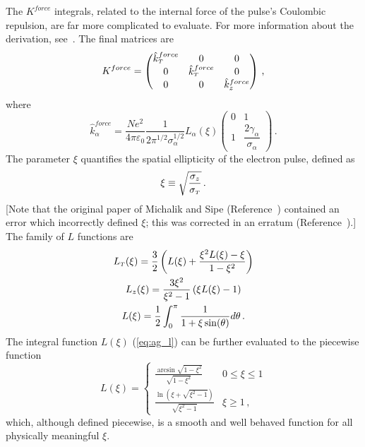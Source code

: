The $K^{force}$ integrals, related to the internal force of the pulse's Coulombic repulsion, are far more complicated to evaluate.
For more information about the derivation, see~\cite{michalik_analytic_2006}. %
The final matrices are
\begin{equation}
  K^{force} = 
  \begin{pmatrix}
    \hat{k}^{force}_{{\scriptscriptstyle T}} & 0 & 0 \\
    0 & \hat{k}^{force}_{{\scriptscriptstyle T}} & 0 \\
    0 & 0 & \hat{k}^{force}_{z}
  \end{pmatrix} \,\text{,}
\end{equation}
where
\begin{equation}
  \hat{k}^{force}_{\alpha} = 
  \frac{N e^2}{4\pi\varepsilon_0} \frac{1}{2\pi^{1/2}\sigma_{\alpha}^{1/2}} L_{\alpha}(\xi)
  \begin{pmatrix}
    0 & 1 \\
    1 & \dfrac{2 \gamma_{\alpha}}{\sigma_{\alpha}}
  \end{pmatrix} \,\text{.}
\end{equation}
The parameter $\xi$ quantifies the spatial ellipticity of the electron pulse, defined as
\begin{equation} \label{eq:define_xi}
  \xi \equiv \sqrt{\dfrac{\sigma_{z}}{\sigma_{{\scriptscriptstyle T}}}} \,\text{.}
\end{equation}
[Note that the original paper of Michalik and Sipe (Reference~\cite{michalik_analytic_2006}) contained an error which incorrectly defined $\xi$; this was corrected in an erratum (Reference~\cite{michalik_erratum:_2008}).]
The family of $L$ functions are
\begin{subequations} \label{eq:ag_l_family}
  \begin{gather}
    L_{{\scriptscriptstyle T}}(\xi) = \frac{3}{2} \left( L(\xi) + \frac{\xi^2 L(\xi) - \xi}{ 1 - \xi^2 } \right) \\
    L_{z}(\xi) = \frac{ 3 \xi^2 }{ \xi^2 - 1} \left( \xi L(\xi) - 1 \right) \\
    L(\xi) = \frac{1}{2} \int_0^{\pi} \frac{1}{1+\xi\sin(\theta)} d\theta \,\text{.} \label{eq:ag_l}
  \end{gather}
\end{subequations}
The integral function $L(\xi)$ (\ref{eq:ag_l}) can be further evaluated to the piecewise function
\begin{equation}
  L(\xi) = 
  \begin{cases}
    \frac{ \arcsin \sqrt{1-\xi^2} }{ \sqrt{1-\xi^2} } & 0 \le \xi \le 1 \\
    \frac{ \ln\left( \xi + \sqrt{\xi^2 - 1} \right) }{ \sqrt{\xi^2 - 1} } & \xi \ge 1 \,\text{,}
  \end{cases}
\end{equation}
which, although defined piecewise, is a smooth and well behaved function for all physically meaningful $\xi$.

